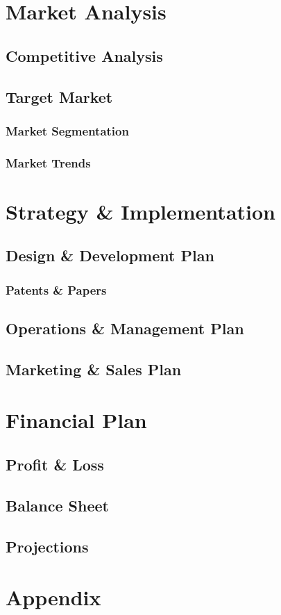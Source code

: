 \documentclass[titlepage]{article}
\begin{document}
\section{Market Analysis}
\subsection{Competitive Analysis}
\subsection{Target Market}
\subsubsection{Market Segmentation}
\subsubsection{Market Trends}


\section{Strategy \& Implementation}
\subsection{Design \& Development Plan}
\subsubsection{Patents \& Papers}
\subsection{Operations \& Management Plan}
\subsection{Marketing \& Sales Plan}


\section{Financial Plan}
\subsection{Profit \& Loss}
\subsection{Balance Sheet}
\subsection{Projections}


\section{Appendix}
\end{document}
